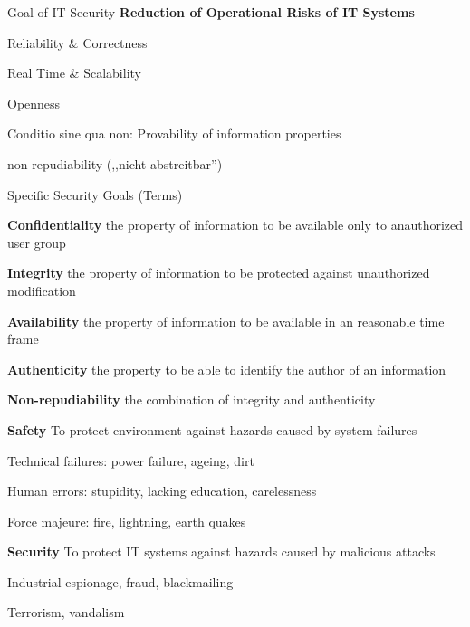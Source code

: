 \documentclass[a4paper]{article}
\begin{document}
\raggedright
\begin{multicols}{3}\scriptsize
    \setlength{\premulticols}{1pt}
    \setlength{\postmulticols}{1pt}
    \setlength{\multicolsep}{1pt}
    \setlength{\columnsep}{2pt}

    Goal of IT Security \textbf{Reduction of Operational Risks of IT Systems}
    \begin{itemize*}
        \item Reliability \& Correctness
        \item Real Time \& Scalability
        \item Openness
        \item Conditio sine qua non: Provability of information properties
        \item non-repudiability (,,nicht-abstreitbar'')
    \end{itemize*}

    Specific Security Goals (Terms)
    \begin{itemize*}
        \item \textbf{Confidentiality} the property of information to be available only to anauthorized user group
        \item \textbf{Integrity} the property of information to be protected against unauthorized modification
        \item \textbf{Availability} the property of information to be available in an reasonable time frame
        \item \textbf{Authenticity} the property to be able to identify the author of an information
        \item \textbf{Non-repudiability} the combination of integrity and authenticity
        \item \textbf{Safety} To protect environment against hazards caused by system failures
        \begin{itemize*}
            \item Technical failures: power failure, ageing, dirt
            \item Human errors: stupidity, lacking education, carelessness
            \item Force majeure: fire, lightning, earth quakes
        \end{itemize*}
        \item \textbf{Security} To protect IT systems against hazards caused by malicious attacks
        \begin{itemize*}
            \item Industrial espionage, fraud, blackmailing
            \item Terrorism, vandalism
        \end{itemize*}
    \end{itemize*}


\end{multicols}
\end{document}
